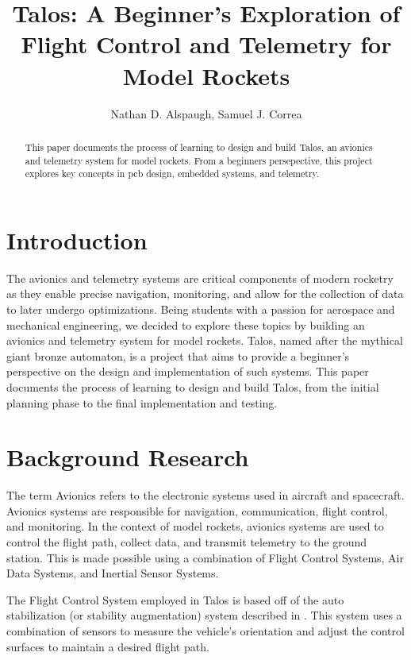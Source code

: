 \documentclass{article}
\title{Talos: A Beginner's Exploration of Flight Control and Telemetry for Model Rockets}
\author{Nathan D. Alspaugh, Samuel J. Correa}
\begin{document}
\maketitle

\begin{abstract}
      This paper documents the process of learning to design and build Talos, an avionics and telemetry system for model rockets. From a beginners persepective, this project explores key concepts in pcb design, embedded systems, and telemetry.
\end{abstract}

\section{Introduction}

The avionics and telemetry systems are critical components of modern rocketry as they enable precise navigation, monitoring, and allow for the collection of data to later undergo optimizations. Being students with a passion for aerospace and mechanical engineering, we decided to explore these topics by building an avionics and telemetry system for model rockets. Talos, named after the mythical giant bronze automaton, is a project that aims to provide a beginner's perspective on the design and implementation of such systems. This paper documents the process of learning to design and build Talos, from the initial planning phase to the final implementation and testing.

\section{Background Research}

The term Avionics refers to the electronic systems used in aircraft and spacecraft. Avionics systems are responsible for navigation, communication, flight control, and monitoring. In the context of model rockets, avionics systems are used to control the flight path, collect data, and transmit telemetry to the ground station. This is made possible using a combination of Flight Control Systems, Air Data Systems, and Inertial Sensor Systems.


The Flight Control System employed in Talos is based off of the auto stabilization (or stability augmentation) system described in \cite{Collinson_2012}. This system uses a combination of sensors to measure the vehicle's orientation and adjust the control surfaces to maintain a desired flight path.
\end{document}
